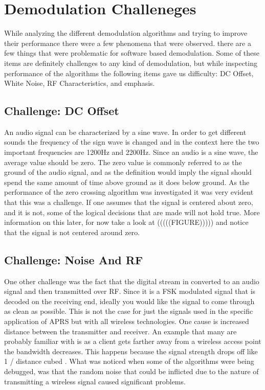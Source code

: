 \chapter{Demodulation Challeneges}
While analyzing the different demodulation algorithms and trying to improve their performance there were a few phenomena that were observed. there are a few things that were problematic for software based demodulation. Some of these items are definitely challenges to any kind of demodulation, but while inspecting performance of the algorithms the following items gave us difficulty: DC Offset, White Noise, RF Characteristics, and emphasis.

\section{Challenge: DC Offset}
An audio signal can be characterized by a sine wave. In order to get different sounds the frequency of the sign wave is changed and in the context here the two important frequencies are 1200Hz and 2200Hz. Since an audio is a sine wave, the average value should be zero. The zero value is commonly referred to as the ground of the audio signal, and as the definition would imply the signal should spend the same amount of time above ground as it does below ground. As the performance of the zero crossing algorithm was investigated it was very evident that this was a challenge. If one assumes that the signal is centered about zero, and it is not, some of the logical decisions that are made will not hold true. More information on this later, for now take a look at (((((FIGURE))))) and notice that the signal is not centered around zero.

\section{Challenge: Noise And RF}
One other challenge was the fact that the digital stream in converted to an audio signal and then transmitted over RF. Since it is a FSK modulated signal that is decoded on the receiving end, ideally you would like the signal to come through as clean as possible. This is not the case for just the signals used in the specific application of APRS but with all wireless technologies. One cause is increased distance between the transmitter and receiver. An example that many are probably familiar with is as a client gets farther away from a wireless access point the bandwidth decreases. This happens because the signal strength drops off like 1 / distance cubed \cite{4Gon}. What was noticed when some of the algorithms were being debugged, was that the random noise that could be inflicted due to the nature of transmitting a wireless signal caused significant problems.

